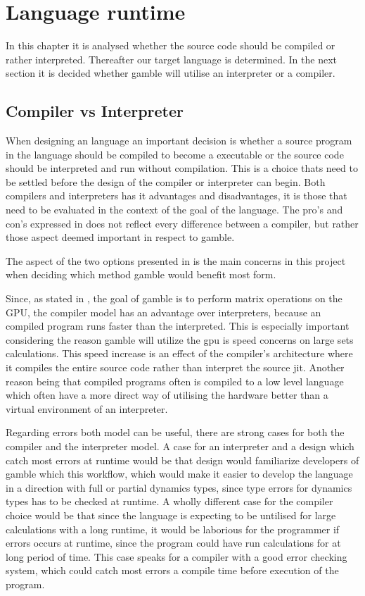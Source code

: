 \chapter{Language runtime}
In this chapter it is analysed whether the source code should be compiled or rather interpreted.
Thereafter our target language is determined.
In the next section it is decided whether \gls{gamble} will utilise an interpreter or a compiler.

\section{Compiler vs Interpreter}
When designing an language an important decision is whether a source program in the language should be compiled to become a executable or the source code should be interpreted and run without compilation.
This is a choice thats need to be settled before the design of the compiler or interpreter can begin.
Both compilers and interpreters has it advantages and disadvantages, it is those that need to be evaluated in the context of the goal of the language.
The pro's and con's expressed in  does not reflect every difference between a compiler, but rather those aspect deemed important in respect to \gls{gamble}.



The aspect of the two options presented in  is the main concerns in this project when deciding which method \gls{gamble} would benefit most form.

Since, as stated in , the goal of \gls{gamble} is to perform matrix operations on the GPU, the compiler model has an advantage over interpreters, because an compiled program runs faster than the interpreted. 
This is especially important considering the reason \gls{gamble} will utilize the \acrshort{gpu} is speed concerns on large sets calculations.
This speed increase is an effect of the compiler's architecture where it compiles the entire source code rather than interpret the source \acrfull{jit}.
Another reason being that compiled programs often is compiled to a low level language which often have a more direct way of utilising the hardware better than a virtual environment of an interpreter.

Regarding errors both model can be useful, there are strong cases for both the compiler and the interpreter model.
A case for an interpreter and a design which catch most errors at runtime would be that design would familiarize developers of \gls{gamble} which this workflow, which would make it easier to develop the language in a direction with full or partial dynamics types, since type errors for dynamics types has to be checked at runtime.
A wholly different case for the compiler choice would be that since the language is expecting to be untilised for large calculations with a long runtime, it would be laborious for the programmer if errors occurs at runtime, since the program could have run calculations for at long period of time.
This case speaks for a compiler with a good error checking system, which could catch most errors a compile time before execution of the program.\citep{Sebesta, Crafting_book}

